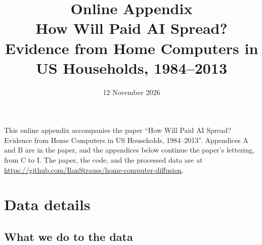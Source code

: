 \documentclass[11pt]{article}
\title{Online Appendix\\[0.4em]
\large How Will Paid AI Spread? Evidence from Home Computers in US Households, 1984--2013}
\author{}
\date{12 November 2026}
\begin{document}
\maketitle

\noindent This online appendix accompanies the paper ``How Will Paid AI Spread? Evidence from Home Computers in US Households, 1984--2013''. Appendices A and B are in the paper, and the appendices below continue the paper's lettering, from C to I. The paper, the code, and the processed data are at \url{https://github.com/IlanStrauss/home-computer-diffusion}.

\setcounter{tocdepth}{2}
{\setlength{\parskip}{0pt}\tableofcontents}

\clearpage
\appendix
\setcounter{section}{2}
\renewcommand{\thefigure}{\thesection\arabic{figure}}
\renewcommand{\thetable}{\thesection\arabic{table}}

\section{Data details}
\label{app:data}

\subsection{What we do to the data}
\label{app:prep}
\end{document}
